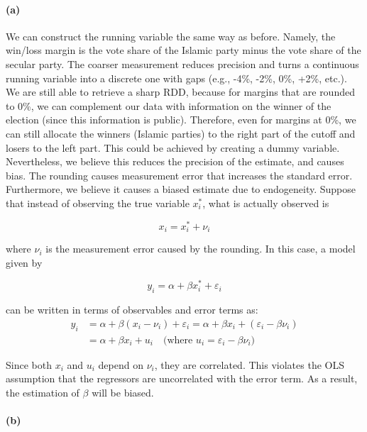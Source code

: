 \documentclass{scrartcl}
\begin{document}
\paragraph*{(a)}

We can construct the running variable the same way as before. Namely, the win/loss margin is the vote share of the Islamic party minus the vote share of the secular party. The coarser measurement reduces precision and turns a continuous running variable into a discrete one with gaps (e.g., -4\%, -2\%, 0\%, +2\%, etc.). We are still able to retrieve a sharp RDD, because for margins that are rounded to 0\%, we can complement our data with information on the winner of the election (since this information is public). Therefore, even for margins at 0\%, we can still allocate the winners (Islamic parties) to the right part of the cutoff and losers to the left part. This could be achieved by creating a dummy variable. Nevertheless, we believe this reduces the precision of the estimate, and causes bias. The rounding causes measurement error that increases the standard error. Furthermore, we believe it causes a biased estimate due to endogeneity. Suppose that instead of observing the true variable \( x_i^* \), what is actually observed is 

\[
x_i = x_i^* + \nu_i
\]

where \( \nu_i \) is the measurement error caused by the rounding. In this case, a model given by

\[
y_i = \alpha + \beta x_i^* + \varepsilon_i
\]

can be written in terms of observables and error terms as:
\begin{align*}
y_i &= \alpha + \beta (x_i - \nu_i) + \varepsilon_i 
 =  \alpha + \beta x_i + (\varepsilon_i - \beta \nu_i) \\
    &= \alpha + \beta x_i + u_i \quad \text{(where } u_i = \varepsilon_i - \beta \nu_i \text{)}
\end{align*}

Since both \( x_i \) and \( u_i \) depend on \( \nu_i \), they are correlated. This violates the OLS assumption that the regressors are uncorrelated with the error term. As a result, the estimation of \( \beta \) will be biased.


\paragraph*{(b)}
\end{document}
